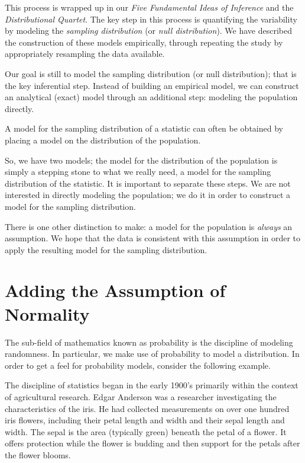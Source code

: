 \documentclass[]{book}
\theoremstyle{definition}
\theoremstyle{definition}
\theoremstyle{remark}
\let\BeginKnitrBlock\begin \let\EndKnitrBlock\end
\begin{document}
This process is wrapped up in our \emph{Five Fundamental Ideas of
Inference} and the \emph{Distributional Quartet}. The key step in this
process is quantifying the variability by modeling the \emph{sampling
distribution} (or \emph{null distribution}). We have described the
construction of these models empirically, through repeating the study by
appropriately resampling the data available.

Our goal is still to model the sampling distribution (or null
distribution); that is the key inferential step. Instead of building an
empirical model, we can construct an analytical (exact) model through an
additional step: modeling the population directly.

\BeginKnitrBlock{rmdkeyidea}
A model for the sampling distribution of a statistic can often be
obtained by placing a model on the distribution of the population.
\EndKnitrBlock{rmdkeyidea}

So, we have two models; the model for the distribution of the population
is simply a stepping stone to what we really need, a model for the
sampling distribution of the statistic. It is important to separate
these steps. We are not interested in directly modeling the population;
we do it in order to construct a model for the sampling distribution.

There is one other distinction to make: a model for the population is
\emph{always} an assumption. We hope that the data is consistent with
this assumption in order to apply the resulting model for the sampling
distribution.

\section{Adding the Assumption of
Normality}\label{adding-the-assumption-of-normality}

The sub-field of mathematics known as probability is the discipline of
modeling randomness. In particular, we make use of probability to model
a distribution. In order to get a feel for probability models, consider
the following example.

\BeginKnitrBlock{example}[Iris Characteristics]
\protect\hypertarget{ex:ex-iris}{}{\label{ex:ex-iris} {} }The discipline of statistics began in the early
1900's primarily within the context of agricultural research. Edgar
Anderson was a researcher investigating the characteristics of the iris.
He had collected measurements on over one hundred iris flowers,
including their petal length and width and their sepal length and width.
The sepal is the area (typically green) beneath the petal of a flower.
It offers protection while the flower is budding and then support for
the petals after the flower blooms.
\EndKnitrBlock{example}
\end{document}

